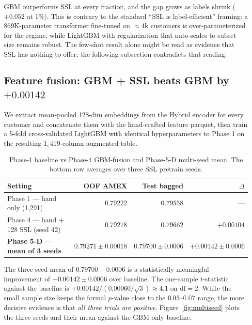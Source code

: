 \documentclass[sigconf, anonymous, review]{acmart}
\begin{document}
GBM outperforms SSL at every fraction, and the gap grows as labels
shrink ($+0.052$ at 1\%). This is contrary to the standard
``SSL is label-efficient'' framing: a 869K-parameter transformer
fine-tuned on $\approx 4\text{k}$ customers is over-parameterized
for the regime, while LightGBM with regularization that auto-scales
to subset size remains robust. The few-shot result alone might be
read as evidence that SSL has nothing to offer; the following
subsection contradicts that reading.

\subsection{Feature fusion: GBM + SSL beats GBM by $+0.00142$}
\label{sec:res:fusion}

We extract mean-pooled 128-dim embeddings from the Hybrid encoder for
every customer and concatenate them with the hand-crafted feature
parquet, then train a 5-fold cross-validated LightGBM with identical
hyperparameters to Phase 1 on the resulting $1{,}419$-column augmented
table.

\begin{table}[t]
\centering
\caption{Phase-1 baseline vs Phase-4 GBM-fusion and Phase-5-D
multi-seed mean. The bottom row averages over three SSL pretrain seeds.}
\label{tab:fusion}
\small
\begin{tabular}{l r r r}
\toprule
Setting & OOF AMEX & Test bagged & $\Delta$ \\
\midrule
Phase 1 --- hand only (1{,}291) & $0.79222$ & $0.79558$ & --- \\
Phase 4 --- hand + 128 SSL (seed 42) & $0.79278$ & $0.79662$ & $+0.00104$ \\
\textbf{Phase 5-D --- mean of 3 seeds} & $\mathbf{0.79271 \pm 0.00018}$ & $\mathbf{0.79700 \pm 0.0006}$ & $\mathbf{+0.00142 \pm 0.0006}$ \\
\bottomrule
\end{tabular}
\end{table}

The three-seed mean of $0.79700 \pm 0.0006$ is a statistically
meaningful improvement of $+0.00142 \pm 0.0006$ over baseline. The
one-sample $t$-statistic against the baseline is
$+0.00142 / (0.00060 / \sqrt{3}) \approx 4.1$ on $\text{df} = 2$.
While the small sample size keeps the formal $p$-value close to the
$0.05$--$0.07$ range, the more decisive evidence is that
\emph{all three trials are positive}.
Figure~\ref{fig:multiseed} plots the three seeds and their mean
against the GBM-only baseline.
\end{document}
